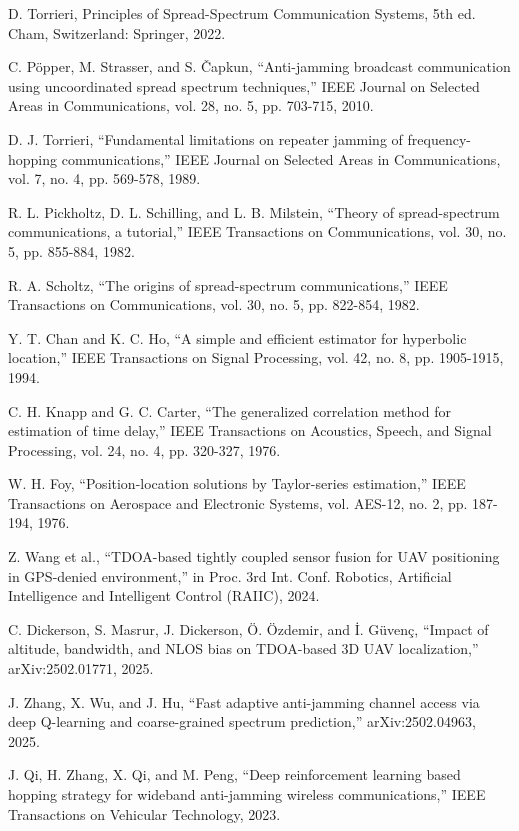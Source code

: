  D. Torrieri, Principles of Spread-Spectrum Communication Systems, 5th ed. Cham, Switzerland: Springer, 2022.

 C. Pöpper, M. Strasser, and S. \v{C}apkun, ``Anti-jamming broadcast communication using uncoordinated spread spectrum techniques,'' IEEE Journal on Selected Areas in Communications, vol. 28, no. 5, pp. 703-715, 2010.

 D. J. Torrieri, ``Fundamental limitations on repeater jamming of frequency-hopping communications,'' IEEE Journal on Selected Areas in Communications, vol. 7, no. 4, pp. 569-578, 1989.

 R. L. Pickholtz, D. L. Schilling, and L. B. Milstein, ``Theory of spread-spectrum communications, a tutorial,'' IEEE Transactions on Communications, vol. 30, no. 5, pp. 855-884, 1982.

 R. A. Scholtz, ``The origins of spread-spectrum communications,'' IEEE Transactions on Communications, vol. 30, no. 5, pp. 822-854, 1982.

 Y. T. Chan and K. C. Ho, ``A simple and efficient estimator for hyperbolic location,'' IEEE Transactions on Signal Processing, vol. 42, no. 8, pp. 1905-1915, 1994.

 C. H. Knapp and G. C. Carter, ``The generalized correlation method for estimation of time delay,'' IEEE Transactions on Acoustics, Speech, and Signal Processing, vol. 24, no. 4, pp. 320-327, 1976.

 W. H. Foy, ``Position-location solutions by Taylor-series estimation,'' IEEE Transactions on Aerospace and Electronic Systems, vol. AES-12, no. 2, pp. 187-194, 1976.

 Z. Wang et al., ``TDOA-based tightly coupled sensor fusion for UAV positioning in GPS-denied environment,'' in Proc. 3rd Int. Conf. Robotics, Artificial Intelligence and Intelligent Control (RAIIC), 2024.

 C. Dickerson, S. Masrur, J. Dickerson, Ö. Özdemir, and \.{I}. Güvenç, ``Impact of altitude, bandwidth, and NLOS bias on TDOA-based 3D UAV localization,'' arXiv:2502.01771, 2025.

 J. Zhang, X. Wu, and J. Hu, ``Fast adaptive anti-jamming channel access via deep Q-learning and coarse-grained spectrum prediction,'' arXiv:2502.04963, 2025.

 J. Qi, H. Zhang, X. Qi, and M. Peng, ``Deep reinforcement learning based hopping strategy for wideband anti-jamming wireless communications,'' IEEE Transactions on Vehicular Technology, 2023.

